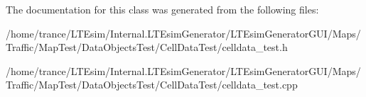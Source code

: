 The documentation for this class was generated from the following files\+:\begin{DoxyCompactItemize}
\item 
/home/trance/\+L\+T\+Esim/\+Internal.\+L\+T\+Esim\+Generator/\+L\+T\+Esim\+Generator\+G\+U\+I/\+Maps/\+Traffic/\+Map\+Test/\+Data\+Objects\+Test/\+Cell\+Data\+Test/celldata\+\_\+test.\+h\item 
/home/trance/\+L\+T\+Esim/\+Internal.\+L\+T\+Esim\+Generator/\+L\+T\+Esim\+Generator\+G\+U\+I/\+Maps/\+Traffic/\+Map\+Test/\+Data\+Objects\+Test/\+Cell\+Data\+Test/celldata\+\_\+test.\+cpp\end{DoxyCompactItemize}
